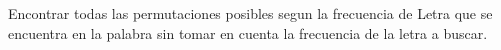 Encontrar todas las permutaciones posibles segun la frecuencia de Letra que se encuentra en la palabra sin tomar en cuenta la frecuencia de la letra a buscar.
